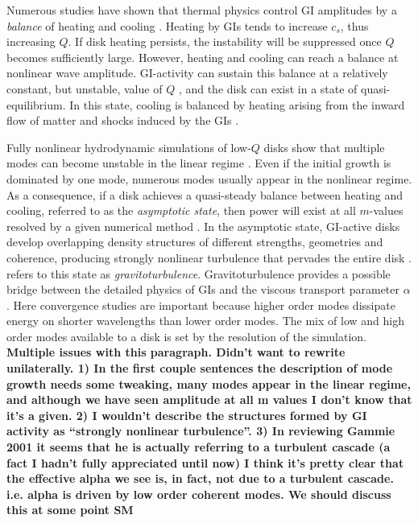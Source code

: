 \documentclass[manuscript]{aastex}
\begin{document}
Numerous studies have shown that thermal physics control GI amplitudes by a {\it balance} of heating and cooling \citep[e.g.,][]{tomley1991,tomley1994,pickett1998,pickett2000, pickett2003,gammie2001,boss2002,rice2003b,mejia2005,boley2006,boley2007, stamatellos2008,cossins2009}.
Heating by GIs tends to increase $c_s$, thus increasing $Q$. If disk heating persists, the instability will be suppressed once $Q$ becomes sufficiently large.  However, heating and cooling can reach a balance at nonlinear wave amplitude. GI-activity can sustain this balance  at a relatively constant,
but unstable, value of $Q$ \citep{paczynski1978, lin1981,goldreich1965}, and 
the disk can exist in a state of quasi-equilibrium. In this state, cooling is 
balanced by heating arising from the inward flow of matter and shocks induced by the GIs
\citep{gammie2001, lodato2004, rice2005, boley2006, cossins2009, vorobyov2010}.

Fully nonlinear hydrodynamic simulations of low-$Q$ disks show that multiple
modes can become unstable in the linear regime \citep{nelson1998, pickett1998, lodato2004,boley2006,cossins2009}.  Even if the initial growth is dominated by one mode, numerous modes usually appear in the nonlinear regime. As a consequence, if a disk achieves a quasi-steady balance between heating and cooling, referred to as the {\it asymptotic state},
then power will exist at all $m$-values resolved by a given numerical method \citep{mejia2005,boley2006}.  
In the asymptotic state, GI-active disks develop overlapping density structures of different strengths, geometries and coherence, producing strongly nonlinear turbulence that pervades the entire disk \citep[e.g.][]{pickett2003, mejia2005,boley2006}.
\citet{gammie2001} refers to this state as {\it gravitoturbulence}. Gravitoturbulence provides a possible bridge between the detailed physics of GIs and the viscous transport parameter $\alpha$.  Here convergence studies are important because 
higher order modes dissipate energy on shorter wavelengths than lower order modes.  The mix of low and high order modes available to a disk is set by the resolution of the simulation. {\bf Multiple issues with this paragraph. Didn't want to rewrite unilaterally. 1) In the first couple sentences the description of mode growth needs some tweaking, many modes appear in the linear regime, and although we have seen amplitude at all m values I don't know that it's a given. 2) I wouldn't describe the structures formed by GI activity as ``strongly nonlinear turbulence''. 3) In reviewing Gammie 2001 it seems that he is actually referring to a turbulent cascade (a fact I hadn't fully appreciated until now) I think it's pretty clear that the effective alpha we see is, in fact, not due to a turbulent cascade. i.e. alpha is driven by low order coherent modes. We should discuss this at some point SM}
\end{document}
